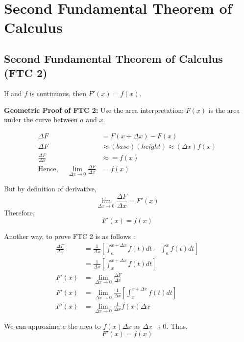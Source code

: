 

\chapter{Second Fundamental Theorem of Calculus}
\bigbreak

\section{Second Fundamental Theorem of Calculus (FTC 2)}

\begin{mdframed}
\begin{center}
	If  and $f$ is continuous, then $F'(x) = f(x)$.
\end{center}
\end{mdframed}

{\bf Geometric Proof of FTC 2: } Use the area interpretation: $F(x)$ is the area under the curve between $a$ and $x$.

\begin{align*}
	\Delta F & = F(x + \Delta x) - F(x) \\
	\Delta F & \approx (base)(height) \approx (\Delta x)f(x) \\
	\frac{\Delta F}{\Delta x} & \approx = f(x) \\
	\text{Hence, } \quad \lim_{\Delta x \to 0} \frac{\Delta F}{\Delta x} & = f(x)
\end{align*}

But by definition of derivative, $$\lim_{\Delta x \to 0} \frac{\Delta F}{\Delta x} = F'(x)$$
Therefore, $$F'(x) = f(x)$$

Another way, to prove FTC 2 is as follows : 
\begin{align*}
	\frac{\Delta F}{\Delta x} & = \frac{1}{\Delta x} \left[ \int_a^{x+\Delta x} f(t) dt - \int_a^x f(t) dt \right] \\
		& = \frac{1}{\Delta x} \left[ \int_x^{x+\Delta x} f(t) dt \right] \\
	F'(x) & = \lim_{\Delta x \to 0} \frac{\Delta F}{\Delta x} \\
	F'(x) & = \lim_{\Delta x \to 0} \frac{1}{\Delta x} \left[ \int_x^{x+\Delta x} f(t) dt \right] \\
	F'(x) & = \lim_{\Delta x \to 0} \frac{1}{\Delta x} f(x) \Delta x
\end{align*}

We can approximate the area to $f(x) \Delta x$ as $\Delta x \to 0$. Thus, $$ F'(x) = f(x) $$
